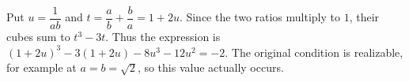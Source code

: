 Put $u=\dfrac{1}{ab}$ and $t=\dfrac{a}{b}+\dfrac{b}{a}=1+2u$. Since the two ratios multiply to $1$, their cubes sum to $t^3-3t$. Thus the expression is $(1+2u)^3-3(1+2u)-8u^3-12u^2=\boxed{-2}$. The original condition is realizable, for example at $a=b=\sqrt2$, so this value actually occurs.
